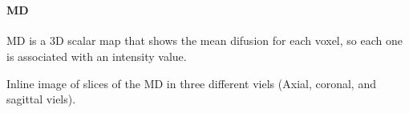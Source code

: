 \documentclass{article}
\begin{document}
    \begin{center}
    \end{center}
    { \hspace*{\fill} \\}
    
    \paragraph{MD}\label{md}

MD is a 3D scalar map that shows the mean difusion for each voxel, so
each one is associated with an intensity value.

Inline image of slices of the MD in three different viels (Axial,
coronal, and sagittal viels).
\end{document}

